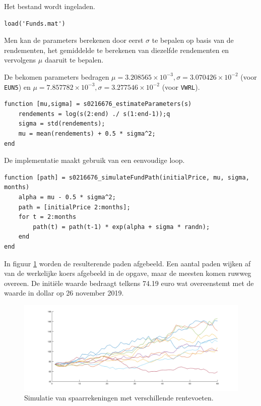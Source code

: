 

Het bestand wordt ingeladen.

\begin{lstlisting}
load('Funds.mat')
\end{lstlisting}



Men kan de parameters berekenen door eerst $\sigma$ te bepalen op basis van de rendementen, het gemiddelde te berekenen van diezelfde rendementen en vervolgens $\mu$ daaruit te bepalen.\\
\par\noindent De bekomen parameters bedragen $\mu = 3.208565\times 10^{-3}, \sigma = 3.070426\times 10^{-2}$ (voor \texttt{EUN5}) en $\mu = 7.857782\times 10^{-3}, \sigma = 3.277546\times 10^{-2}$ (voor \texttt{VWRL}).

\begin{lstlisting}
function [mu,sigma] = s0216676_estimateParameters(s)
    rendements = log(s(2:end) ./ s(1:end-1));q
    sigma = std(rendements);
    mu = mean(rendements) + 0.5 * sigma^2;
end
\end{lstlisting}



De implementatie maakt gebruik van een eenvoudige  loop.

\begin{lstlisting}
function [path] = s0216676_simulateFundPath(initialPrice, mu, sigma, months)
    alpha = mu - 0.5 * sigma^2;
    path = [initialPrice 2:months];
    for t = 2:months
        path(t) = path(t-1) * exp(alpha + sigma * randn);
    end
end
\end{lstlisting}



In figuur \ref{fig:op6} worden de resulterende paden afgebeeld. Een aantal paden wijken af van de werkelijke koers afgebeeld in de opgave, maar de meesten komen ruwweg overeen. De initi\"ele waarde bedraagt telkens 74.19 euro wat overeenstemt met de waarde in dollar op 26 november 2019.

\begin{figure}[h]
\centering
\includegraphics[width=\textwidth]{res/op6.png}
\caption{Simulatie van spaarrekeningen met verschillende rentevoeten.}
\label{fig:op6}
\end{figure}

